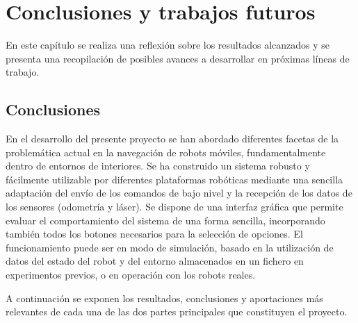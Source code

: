 
\chapter{Conclusiones y trabajos futuros}\label{ch:conclusiones}

En este capítulo se realiza una reflexión sobre los resultados alcanzados y se presenta una recopilación de posibles avances a desarrollar en próximas líneas de trabajo.

\section{Conclusiones}

En el desarrollo del presente proyecto se han abordado diferentes facetas de la problemática actual en la navegación de robots móviles, fundamentalmente dentro de entornos de interiores. Se ha construido un sistema robusto y fácilmente utilizable por diferentes plataformas robóticas mediante una sencilla adaptación del envío de los comandos de bajo nivel y la recepción de los datos de los sensores (odometría y láser). Se dispone de una interfaz gráfica que permite evaluar el comportamiento del sistema de una forma sencilla, incorporando también todos los botones necesarios para la selección de opciones. El funcionamiento puede ser en modo de simulación, basado en la utilización de datos del estado del robot y del entorno almacenados en un fichero en experimentos previos, o en operación con los robots reales.

A continuación se exponen los resultados, conclusiones y aportaciones más relevantes de cada una de las dos partes principales que constituyen el proyecto.

